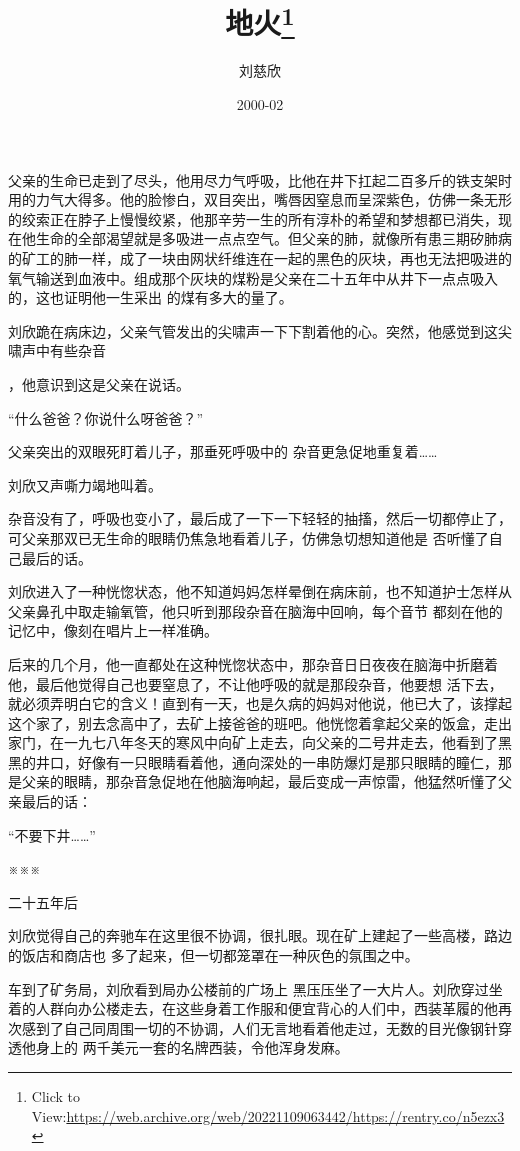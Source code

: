 \documentclass{article}
\title{地火\footnote{Click to View:\url{https://web.archive.org/web/20221109063442/https://rentry.co/n5ezx3}}}
\author{刘慈欣}
\date{2000-02}
\begin{document}

\maketitle


\Large

﻿父亲的生命已走到了尽头，他用尽力气呼吸，比他在井下扛起二百多斤的铁支架时用的力气大得多。他的脸惨白，双目突出，嘴唇因窒息而呈深紫色，仿佛一条无形的绞索正在脖子上慢慢绞紧，他那辛劳一生的所有淳朴的希望和梦想都已消失，现在他生命的全部渴望就是多吸进一点点空气。但父亲的肺，就像所有患三期矽肺病的矿工的肺一样，成了一块由网状纤维连在一起的黑色的灰块，再也无法把吸进的氧气输送到血液中。组成那个灰块的煤粉是父亲在二十五年中从井下一点点吸入的，这也证明他一生采出
的煤有多大的量了。 

刘欣跪在病床边，父亲气管发出的尖啸声一下下割着他的心。突然，他感觉到这尖啸声中有些杂音

\newpage
，他意识到这是父亲在说话。 


“什么爸爸？你说什么呀爸爸？” 

父亲突出的双眼死盯着儿子，那垂死呼吸中的
杂音更急促地重复着…… 


刘欣又声嘶力竭地叫着。 

杂音没有了，呼吸也变小了，最后成了一下一下轻轻的抽搐，然后一切都停止了，可父亲那双已无生命的眼睛仍焦急地看着儿子，仿佛急切想知道他是
否听懂了自己最后的话。 

刘欣进入了一种恍惚状态，他不知道妈妈怎样晕倒在病床前，也不知道护士怎样从父亲鼻孔中取走输氧管，他只听到那段杂音在脑海中回响，每个音节
都刻在他的记忆中，像刻在唱片上一样准确。 

后来的几个月，他一直都处在这种恍惚状态中，那杂音日日夜夜在脑海中折磨着他，最后他觉得自己也要窒息了，不让他呼吸的就是那段杂音，他要想
\newpage
活下去，就必须弄明白它的含义！直到有一天，也是久病的妈妈对他说，他已大了，该撑起这个家了，别去念高中了，去矿上接爸爸的班吧。他恍惚着拿起父亲的饭盒，走出家门，在一九七八年冬天的寒风中向矿上走去，向父亲的二号井走去，他看到了黑黑的井口，好像有一只眼睛看着他，通向深处的一串防爆灯是那只眼睛的瞳仁，那是父亲的眼睛，那杂音急促地在他脑海响起，最后变成一声惊雷，他猛然听懂了父
亲最后的话： 


“不要下井……” 


※※※ 


二十五年后 

刘欣觉得自己的奔驰车在这里很不协调，很扎眼。现在矿上建起了一些高楼，路边的饭店和商店也
多了起来，但一切都笼罩在一种灰色的氛围之中。 

车到了矿务局，刘欣看到局办公楼前的广场上
\newpage
黑压压坐了一大片人。刘欣穿过坐着的人群向办公楼走去，在这些身着工作服和便宜背心的人们中，西装革履的他再次感到了自己同周围一切的不协调，人们无言地看着他走过，无数的目光像钢针穿透他身上的
两千美元一套的名牌西装，令他浑身发麻。 
\end{document}
